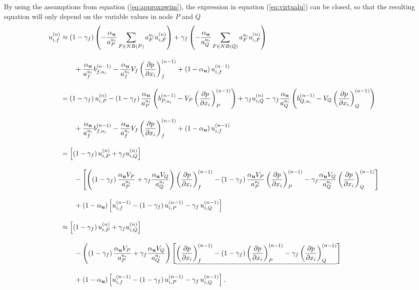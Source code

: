 By using the assumptions from equation (\ref{eq:approxpwim}), the expression in equation (\ref{eq:virtualu}) can be closed, so that the resulting equation will only depend on the variable values in node \(P\) and \(Q\)
\begin{align}
  \allowdisplaybreaks
  \label{eq:closepwim}
  u_{i,f}^{(n)} 
  &\approx 
  \left(1-\gamma_f\right)  \left( -\frac{\alpha_\vec{u}}{a_P^{u_i}} \sum_{F \in NB(P)} a_F^{u_i} u_{i,F}^{(n)} \right)
  +\gamma_f  \left( -\frac{\alpha_\vec{u}}{a_Q^{u_i}} \sum_{F \in NB(Q)} a_F^{u_i} u_{i,F}^{(n)}  \right) \nonumber \\[1em]
  &\quad\quad+ \frac{\alpha_\vec{u}}{a_f^{u_i}}b_{f,u_i}^{(n-1)} 
  - \frac{\alpha_{\vec{u}}}{a_f^{u_i}}V_f\left(\frac{\partial p}{\partial x_i}\right)_f^{(n-1)} 
  + \left(1 - \alpha_{\vec{u}}\right) u_{i,f}^{(n-1)} \nonumber \\[1em]
  &=
  \left(1-\gamma_f\right) u_{i,P}^{(n)} - \left(1 - \gamma_f\right) \frac{\alpha_{\vec{u}}}{a_P^{u_i}}\left(  b_{P,u_i}^{(n-1)} - V_P \left(\frac{\partial p}{\partial x_i}\right)_P^{(n-1)} \right) 
  +\gamma_f  u_{i,Q}^{(n)} - \gamma_f \frac{\alpha_{\vec{u}}}{a_Q^{u_i}} \left( b_{Q,u_i}^{(n-1)} - V_Q \left(\frac{\partial p}{\partial x_i}\right)_Q^{(n-1)}  \right) \nonumber \\[1em]
  &\quad\quad+ \frac{\alpha_{\vec{u}}}{a_f^{u_i}}b_{f,u_i}^{(n-1)} 
  - \frac{\alpha_{\vec{u}}}{a_f^{u_i}}V_f\left(\frac{\partial p}{\partial x_i}\right)_f^{(n-1)}
  + \left(1 - \alpha_{\vec{u}}\right) u_{i,f}^{(n-1)} \nonumber \\[1em]
  &=
  \left[\left(1 - \gamma_f\right) u_{i,P}^{(n)} + \gamma_f u_{i,Q}^{(n)} \right] \nonumber\\[1em]
  &\quad\quad - 
  \left[ 
  \left(\left(1 - \gamma_f\right) \frac{\alpha_\vec{u} V_P}{a_P^{u_i}} + \gamma_f \frac{\alpha_\vec{u} V_Q}{a_Q^{u_i}}\right)
  \left(\frac{\partial p}{\partial x_i}\right)_f^{(n-1)} 
  - \left(1 - \gamma_f \right) \frac{\alpha_\vec{u} V_P}{a_P^{u_i}}\left( \frac{\partial p}{\partial x_i} \right)_P^{(n-1)} 
  - \gamma_f \frac{\alpha_\vec{u} V_Q}{a_Q^{u_i}}\left(\frac{\partial p}{\partial x_i}\right)_Q^{(n-1)}
  \right] \nonumber \\[1em]
  &\quad\quad + \left(1 - \alpha_\vec{u}\right) \left[ u_{i,f}^{(n-1)} - \left(1 - \gamma_f\right) u_{i,P}^{(n-1)} - \gamma_f \, u_{i,Q}^{(n-1)} \right] \nonumber \\[1em]
  &\approx
  \left[\left(1 - \gamma_f\right) u_{i,P}^{(n)} + \gamma_f u_{i,Q}^{(n)} \right] \nonumber\\[1em]
  &\quad\quad - 
  \left(\left(1 - \gamma_f\right) \frac{\alpha_\vec{u} V_P}{a_P^{u_i}} + \gamma_f \frac{\alpha_\vec{u} V_Q}{a_Q^{u_i}}\right)
  \left[ 
    \underline{\left(\frac{\partial p}{\partial x_i}\right)_f^{(n-1)} 
  - \left(1 - \gamma_f \right) \left( \frac{\partial p}{\partial x_i} \right)_P^{(n-1)} 
- \gamma_f \left(\frac{\partial p}{\partial x_i}\right)_Q^{(n-1)}}
  \right] \nonumber \\[1em]
  &\quad\quad + \left(1 - \alpha_\vec{u}\right) \left[ u_{i,f}^{(n-1)} - \left(1 - \gamma_f\right) u_{i,P}^{(n-1)} - \gamma_f \, u_{i,Q}^{(n-1)} \right].
\end{align}
